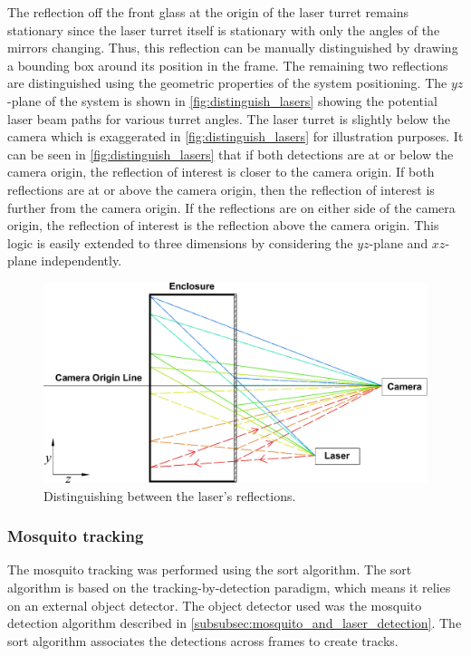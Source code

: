 The reflection off the front glass at the origin of the laser turret remains stationary since the laser turret itself is stationary with only the angles of the mirrors changing. Thus, this reflection can be manually distinguished by drawing a bounding box around its position in the frame. The remaining two reflections are distinguished using the geometric properties of the system positioning. The $yz$-plane of the system is shown in \autoref{fig:distinguish_lasers} showing the potential laser beam paths for various turret angles. The laser turret is slightly below the camera which is exaggerated in \autoref{fig:distinguish_lasers} for illustration purposes. It can be seen in \autoref{fig:distinguish_lasers} that if both detections are at or below the camera origin, the reflection of interest is closer to the camera origin. If both reflections are at or above the camera origin, then the  reflection of interest is further from the camera origin. If the reflections are on either side of the camera origin, the reflection of interest is the reflection above the camera origin. This logic is easily extended to three dimensions by considering the $yz$-plane and $xz$-plane independently.
\begin{figure}[!htb]
  \centering
  \includegraphics[width=\textwidth]{figures/distinguish_lasers.pdf}
  \caption{Distinguishing between the laser's reflections.}
  \label{fig:distinguish_lasers}
\end{figure}



\subsubsection{Mosquito tracking}\label{subsubsec:mosquito_tracking}
The mosquito tracking was performed using the \gls{sort} algorithm. The \gls{sort} algorithm is based on the tracking-by-detection paradigm, which means it relies on an external object detector. The object detector used was the mosquito detection algorithm described in \autoref{subsubsec:mosquito_and_laser_detection}. The \gls{sort} algorithm associates the detections across frames to create tracks.


